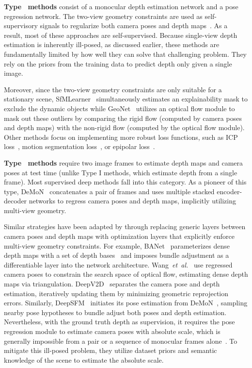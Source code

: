 \documentclass[final]{cvpr}
\def\etal{\emph{et~al.}}
\begin{document}
\textbf{Type~ methods}
consist of a monocular depth estimation network and a pose regression network. The two-view geometry constraints are used as self-supervisory signals to regularize both camera poses and depth maps~\cite{sfmlearner,yin2018geonet,Mahjourian_2018_CVPR,chen2019self,GANVO,Ranjan_2019_CVPR}. 
As a result, most of these approaches are self-supervised.
Because single-view depth estimation is inherently ill-posed, as discussed earlier, these methods are fundamentally limited by how well they can solve that challenging problem. They rely on the priors from the training data to predict depth only given a single image.

Moreover, since the two-view geometry constraints are only suitable for a stationary scene, SfMLearner~\cite{sfmlearner} simultaneously estimates an explainability mask to exclude the dynamic objects while GeoNet~\cite{yin2018geonet} utilizes an optical flow module to mask out these outliers by comparing the rigid flow (computed by camera poses and depth maps) with the non-rigid flow (computed by the optical flow module). Other methods focus on implementing more robust loss functions, such as ICP loss~\cite{Mahjourian_2018_CVPR}, motion segmentation loss~\cite{Ranjan_2019_CVPR}, or epipolar loss~\cite{chen2019self}. 

\textbf{Type~ methods}
require two image frames to estimate depth maps and camera poses at test time (unlike Type I methods, which estimate depth from a single frame).
Most supervised deep methods fall into this category. 
As a pioneer of this type, DeMoN~\cite{ummenhofer2017demon} concatenates a pair of frames and uses multiple stacked encoder-decoder networks to regress camera poses and depth maps, implicitly utilizing multi-view geometry. 

Similar strategies have been adapted by \cite{tang2018ba,clark2018ls,flowmotion,teed2018deepv2d} through replacing generic layers between camera poses and depth maps with optimization layers that explicitly enforce multi-view geometry constraints. For example, BANet~\cite{tang2018ba} parameterizes dense depth maps with a set of depth bases~\cite{zhong2020efficient} and imposes bundle adjustment as a differentiable layer into the network architecture. Wang~\etal~\cite{flowmotion} use regressed camera poses to constrain the search space of optical flow, estimating dense depth maps via triangulation.  
DeepV2D~\cite{teed2018deepv2d} separates the camera pose and depth estimation, iteratively updating them by minimizing geometric reprojection errors. Similarly, DeepSFM~\cite{wei2019deepsfm} initiates its pose estimation from DeMoN~\cite{ummenhofer2017demon}, sampling nearby pose hypotheses to bundle adjust both poses and depth estimation. Nevertheless, with the ground truth depth as supervision, it requires the pose regression module to estimate camera poses with absolute scale, which is generally impossible from a pair or a sequence of monocular frames alone~\cite{hartley2003multiple}. To 
mitigate this ill-posed problem, they utilize dataset priors and semantic knowledge of the scene to estimate the absolute scale. 
\end{document}
